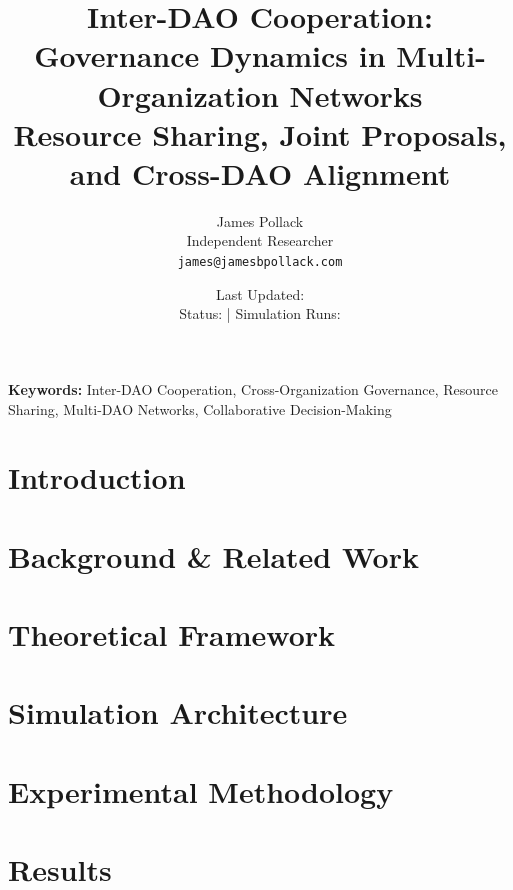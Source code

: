 \documentclass[11pt]{article}
\title{
    \textbf{Inter-DAO Cooperation: Governance Dynamics in Multi-Organization Networks}\\
    \large Resource Sharing, Joint Proposals, and Cross-DAO Alignment
}
\author{
    James Pollack\\
    Independent Researcher\\
    \texttt{james@jamesbpollack.com}
}
\date{
    Last Updated: \lastupdate\\
    \small Status: \paperstatus{} | Simulation Runs: \experimentruns{}
}
\begin{document}
\maketitle

\begin{abstract}

\end{abstract}

\textbf{Keywords:} Inter-DAO Cooperation, Cross-Organization Governance, Resource Sharing, Multi-DAO Networks, Collaborative Decision-Making


\section{Introduction}
\label{sec:introduction}


\section{Background \& Related Work}
\label{sec:background}


\section{Theoretical Framework}
\label{sec:theory}


\section{Simulation Architecture}
\label{sec:architecture}


\section{Experimental Methodology}
\label{sec:methodology}


\section{Results}
\label{sec:results}

\end{document}
